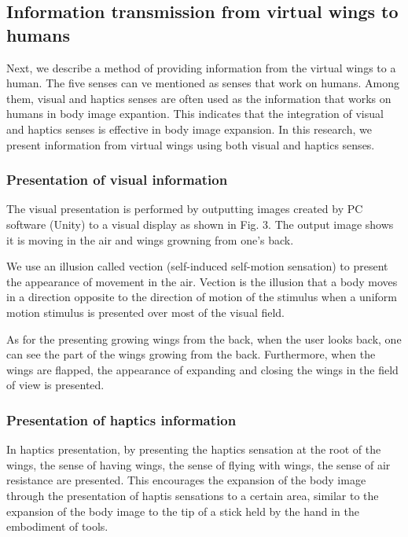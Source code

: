 \documentclass[letterpaper, 10 pt, conference]{ieeeconf}  %
\begin{document}
        \subsection{Information transmission from virtual wings to humans}
                Next, we describe a method of providing information from the virtual wings to a human. 
                The five senses can ve mentioned as senses that work on humans.
                Among them, visual and haptics senses are often used as the information that works on humans in body image expantion.  
                This indicates that the integration of visual and haptics senses is effective in body image expansion. 
                In this research, we present information from virtual wings using both visual and haptics senses.  

                \subsubsection{Presentation of visual information}
                

                        The visual presentation is performed by outputting images created by PC software (Unity) to a visual display as shown in Fig. 3. 
                        The output image shows it is moving in the air and wings growning from one's back.

                        We use an illusion called vection (self-induced self-motion sensation) to present the appearance of movement in the air.
                        Vection is the illusion that a body moves in a direction opposite to the direction of motion of the stimulus when a uniform motion stimulus is presented over most of the visual field.  
                        
                        As for the presenting growing wings from the back, when the user looks back, one can see the part of the wings growing from the back.
                        Furthermore, when the wings are flapped, the appearance of expanding and closing the wings in the field of view is presented.

                \subsubsection{Presentation of haptics information}
                        In haptics presentation, by presenting the haptics sensation at the root of the wings, the sense of having wings, the sense of flying with wings, the sense of air resistance are presented.  
                        This encourages the expansion of the body image through the presentation of haptis sensations to a certain area, similar to the expansion of the body image to the tip of a stick held by the hand in the embodiment of tools.
\end{document}
